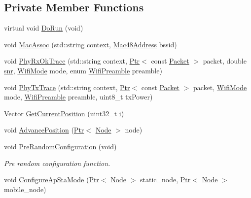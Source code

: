 \subsection*{Private Member Functions}
\begin{DoxyCompactItemize}
\item 
virtual void \hyperlink{classOcbWifiMacTestCase_a730877f90008a4a4e7fd547f964f0f08}{Do\+Run} (void)
\item 
void \hyperlink{classOcbWifiMacTestCase_ac48d9afb4b72f66f11608903a10da2d0}{Mac\+Assoc} (std\+::string context, \hyperlink{classns3_1_1Mac48Address}{Mac48\+Address} bssid)
\item 
void \hyperlink{classOcbWifiMacTestCase_aa0e4495ed57249ab657f1f1ea75f4a37}{Phy\+Rx\+Ok\+Trace} (std\+::string context, \hyperlink{classns3_1_1Ptr}{Ptr}$<$ const \hyperlink{classns3_1_1Packet}{Packet} $>$ packet, double \hyperlink{lte__pathloss_8m_ae6e82a215dff6b79fb6e9952a1b78453}{snr}, \hyperlink{classns3_1_1WifiMode}{Wifi\+Mode} mode, enum \hyperlink{group__wifi_ga5e94a56cb338a14ffbbb19c6a41251eb}{Wifi\+Preamble} preamble)
\item 
void \hyperlink{classOcbWifiMacTestCase_a3ed42be8055159ceb4cc1023deb44f12}{Phy\+Tx\+Trace} (std\+::string context, \hyperlink{classns3_1_1Ptr}{Ptr}$<$ const \hyperlink{classns3_1_1Packet}{Packet} $>$ packet, \hyperlink{classns3_1_1WifiMode}{Wifi\+Mode} mode, \hyperlink{group__wifi_ga5e94a56cb338a14ffbbb19c6a41251eb}{Wifi\+Preamble} preamble, uint8\+\_\+t tx\+Power)
\item 
Vector \hyperlink{classOcbWifiMacTestCase_a95f8ba42ad5edc767aba8f7b2249ba44}{Get\+Current\+Position} (uint32\+\_\+t \hyperlink{lte__uplink__power__control_8m_a6f6ccfcf58b31cb6412107d9d5281426}{i})
\item 
void \hyperlink{classOcbWifiMacTestCase_ad5e48fa54162b72df8c5e1c9701840e6}{Advance\+Position} (\hyperlink{classns3_1_1Ptr}{Ptr}$<$ \hyperlink{classns3_1_1Node}{Node} $>$ node)
\item 
void \hyperlink{classOcbWifiMacTestCase_a8d3d662e40832ac05a5be6b7061671e9}{Pre\+Random\+Configuration} (void)
\begin{DoxyCompactList}\small\item\em Pre random configuration function. \end{DoxyCompactList}\item 
void \hyperlink{classOcbWifiMacTestCase_a5869f3d6cdd3e86ceacfead2a4208546}{Configure\+Ap\+Sta\+Mode} (\hyperlink{classns3_1_1Ptr}{Ptr}$<$ \hyperlink{classns3_1_1Node}{Node} $>$ static\+\_\+node, \hyperlink{classns3_1_1Ptr}{Ptr}$<$ \hyperlink{classns3_1_1Node}{Node} $>$ mobile\+\_\+node)

\end{DoxyCompactItemize}

